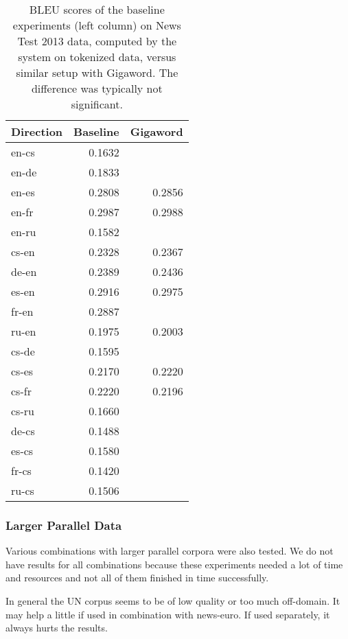 \documentclass[11pt,letterpaper]{article}
\begin{document}
\begin{table}[htbl]
\begin{center}
\begin{tabular}{l | r r}
Direction & Baseline & Gigaword\\
\hline
en-cs & 0.1632 & \\
en-de & 0.1833 & \\
en-es & 0.2808 & 0.2856\\
en-fr & 0.2987 & 0.2988\\
en-ru & 0.1582 & \\
cs-en & 0.2328 & 0.2367\\
de-en & 0.2389 & 0.2436\\
es-en & 0.2916 & 0.2975\\
fr-en & 0.2887 & \\
ru-en & 0.1975 & 0.2003\\
\hline
cs-de & 0.1595 & \\
cs-es & 0.2170 & 0.2220\\
cs-fr & 0.2220 & 0.2196\\
cs-ru & 0.1660 & \\
de-cs & 0.1488 & \\
es-cs & 0.1580 & \\
fr-cs & 0.1420 & \\
ru-cs & 0.1506 & \\
\end{tabular}
\end{center}
\caption{BLEU scores of the baseline experiments (left column) on News Test 2013 data, computed by the system on tokenized data, versus similar setup with Gigaword.
The difference was typically not significant.}
\label{tab:largelmbleu}
\end{table}




\subsubsection{Larger Parallel Data}
\label{sec:un}

Various combinations with larger parallel corpora were also tested.
We do not have results for all combinations because these experiments needed
a lot of time and resources and not all of them finished in time successfully.

In general the UN corpus seems to be of low quality or too much off-domain.
It may help a little if used in combination with news-euro.
If used separately, it always hurts the results.
\end{document}
